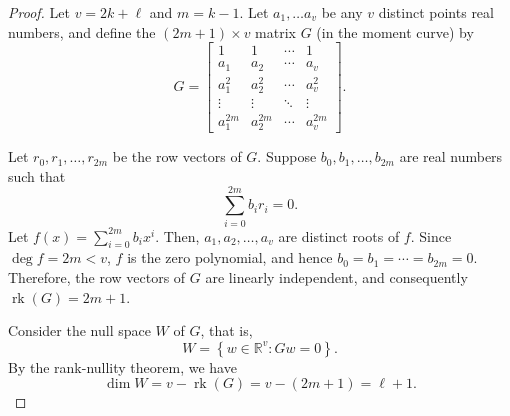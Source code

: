 \begin{proof}
    Let \(v = 2k + \ell\) and \(m = k-1\).
    Let \(a_1, \dots a_v\) be any \(v\) distinct points real numbers,
    and define the \((2m+1) \times v\) matrix \(G\) (in the moment curve) by
    \begin{equation}
        G =
        \begin{bmatrix}
            1 & 1 & \cdots & 1 \\
            a_1 & a_2 & \cdots & a_v \\
            a_1^2 & a_2^2 & \cdots & a_v^2 \\
            \vdots & \vdots & \ddots & \vdots \\
            a_1^{2m} & a_2^{2m} & \cdots & a_v^{2m}
        \end{bmatrix}.
    \end{equation}

    Let \(r_0, r_1, \ldots, r_{2m}\) be the row vectors of \(G\).
    Suppose \(b_0, b_1, \ldots, b_{2m}\) are real numbers such that
    \begin{equation}
        \sum_{i=0}^{2m} b_i r_i = 0.
    \end{equation}
    Let \(f(x) = \sum_{i=0}^{2m} b_i x^i\).
    Then, \(a_1, a_2, \ldots, a_v\) are distinct roots of \(f\).
    Since \(\deg f = 2m < v\),
    \(f\) is the zero polynomial,
    and hence \(b_0 = b_1 = \cdots = b_{2m} = 0\).
    Therefore, the row vectors of \(G\) are linearly independent,
    and consequently \(\operatorname{rk}(G) = 2m+1\).

    Consider the null space \(W\) of \(G\), that is,
    \begin{equation}
        W = \left\{ w \in \mathbb{R}^v : Gw = 0 \right\}.
    \end{equation}
    By the rank-nullity theorem, we have
    \begin{equation}
        \dim W = v - \operatorname{rk}(G) = v - (2m+1) = \ell + 1.
    \end{equation}


\end{proof}
